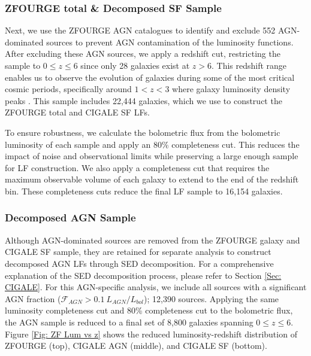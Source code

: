\subsubsection{ZFOURGE total \& Decomposed SF Sample} \label{Sec: Galaxy LF Selection}
Next, we use the ZFOURGE AGN catalogues \citep{cowley_zfourge_2016} to identify and exclude 552 AGN-dominated sources to prevent AGN contamination of the luminosity functions. After excluding these AGN sources, we apply a redshift cut, restricting the sample to $0 \leq z \leq 6$ since only 28 galaxies exist at $z > 6$. This redshift range enables us to observe the evolution of galaxies during some of the most critical cosmic periods, specifically around $1 < z < 3$ \citep{gruppioni_modelling_2011, wylezalek_galaxy_2014} where galaxy luminosity density peaks \citep{assef_mid-ir-_2011}. This sample includes 22,444 galaxies, which we use to construct the ZFOURGE total and CIGALE SF LFs.

To ensure robustness, we calculate the bolometric flux from the bolometric luminosity of each sample and apply an 80\% completeness cut. This reduces the impact of noise and observational limits while preserving a large enough sample for LF construction. We also apply a completeness cut that requires the maximum observable volume of each galaxy to extend to the end of the redshift bin. These completeness cuts reduce the final LF sample to 16,154 galaxies.

\subsubsection{Decomposed AGN Sample} \label{Sec: Decomposed AGN Selection}
Although AGN-dominated sources are removed from the ZFOURGE galaxy and CIGALE SF sample, they are retained for separate analysis to construct decomposed AGN LFs through SED decomposition. For a comprehensive explanation of the SED decomposition process, please refer to Section \ref{Sec: CIGALE}. For this AGN-specific analysis, we include all sources with a significant AGN fraction ($\mathcal{F}_{AGN}>0.1\ L_{AGN}/L_{bol}$); 12,390 sources. Applying the same luminosity completeness cut and 80\% completeness cut to the bolometric flux, the AGN sample is reduced to a final set of 8,800 galaxies spanning $0 \leq z \leq 6$. Figure \ref{Fig: ZF Lum vs z} shows the reduced luminosity-redshift distribution of ZFOURGE (top), CIGALE AGN (middle), and CIGALE SF (bottom).

